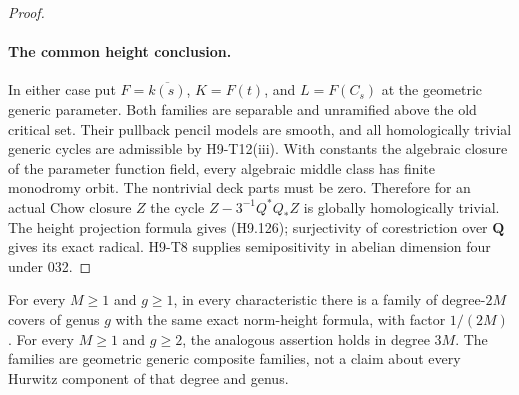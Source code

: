 \begin{proof}
\paragraph{The common height conclusion.}
In either case put $F=\overline{k(s)}$,
$K=F(t)$, and $L=F(C_s)$ at the geometric
generic parameter.
Both families are separable and unramified
above the old critical set. Their pullback
pencil models are smooth, and all
homologically trivial generic cycles are
admissible by H9-T12(iii). With constants
the algebraic closure of the parameter
function field, every algebraic middle
class has finite monodromy orbit. The
nontrivial deck parts must be zero.
Therefore for an actual Chow closure $Z$
the cycle $Z-3^{-1}Q^*Q_*Z$ is globally
homologically trivial. The height
projection formula gives (H9.126);
surjectivity of corestriction over
$\mathbf Q$ gives its exact radical.
H9-T8 supplies semipositivity in abelian
dimension four under 032.
\end{proof}

\begin{corollary}
For every $M\ge1$ and $g\ge1$, in every
characteristic there is a family of degree-$2M$
covers of genus $g$ with the same exact
norm-height formula, with factor $1/(2M)$.
For every $M\ge1$ and $g\ge2$, the analogous
assertion holds in degree $3M$.
The families are geometric generic composite
families, not a claim about every Hurwitz
component of that degree and genus.
\end{corollary}

